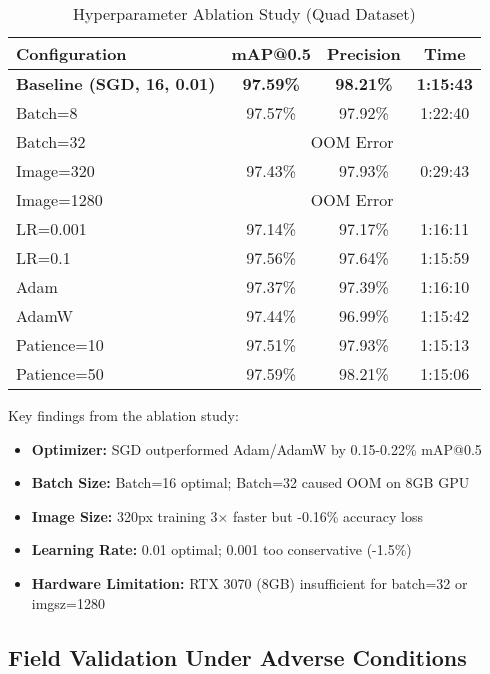 \documentclass[conference]{IEEEtran}
\begin{document}
\begin{table}[h]
\centering
\caption{Hyperparameter Ablation Study (Quad Dataset)}
\begin{tabular}{lccc}
\toprule
\textbf{Configuration} & \textbf{mAP@0.5} & \textbf{Precision} & \textbf{Time} \\
\midrule
\textbf{Baseline (SGD, 16, 0.01)} & \textbf{97.59\%} & \textbf{98.21\%} & \textbf{1:15:43} \\
Batch=8 & 97.57\% & 97.92\% & 1:22:40 \\
Batch=32 & \multicolumn{3}{c}{OOM Error} \\
Image=320 & 97.43\% & 97.93\% & 0:29:43 \\
Image=1280 & \multicolumn{3}{c}{OOM Error} \\
LR=0.001 & 97.14\% & 97.17\% & 1:16:11 \\
LR=0.1 & 97.56\% & 97.64\% & 1:15:59 \\
Adam & 97.37\% & 97.39\% & 1:16:10 \\
AdamW & 97.44\% & 96.99\% & 1:15:42 \\
Patience=10 & 97.51\% & 97.93\% & 1:15:13 \\
Patience=50 & 97.59\% & 98.21\% & 1:15:06 \\
\bottomrule
\end{tabular}
\end{table}

Key findings from the ablation study:
\begin{itemize}
    \item \textbf{Optimizer:} SGD outperformed Adam/AdamW by 0.15-0.22\% mAP@0.5
    \item \textbf{Batch Size:} Batch=16 optimal; Batch=32 caused OOM on 8GB GPU
    \item \textbf{Image Size:} 320px training 3× faster but -0.16\% accuracy loss
    \item \textbf{Learning Rate:} 0.01 optimal; 0.001 too conservative (-1.5\%)
    \item \textbf{Hardware Limitation:} RTX 3070 (8GB) insufficient for batch=32 or imgsz=1280
\end{itemize}

\subsection{Field Validation Under Adverse Conditions}
\end{document}
